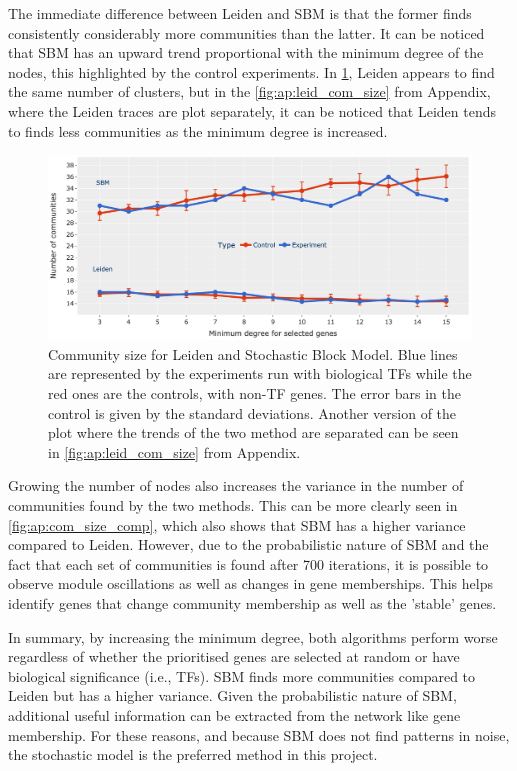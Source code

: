 The immediate difference between Leiden and SBM is that the former finds consistently considerably more communities than the latter. It can be noticed that SBM has an upward trend proportional with the minimum degree of the nodes, this highlighted by the control experiments. In \cref{fig:N_I:comp_size_com_det}, Leiden appears to find the same number of clusters, but in the \cref{fig:ap:leid_com_size} from Appendix, where the Leiden traces are plot separately, it can be noticed that Leiden tends to finds less communities as the minimum degree is increased. 

\begin{figure}[!t]   
\centering
\includegraphics[width=1.0\textwidth,height=1.0\textheight,keepaspectratio]{Sections/Network_I/Resources/selective_pruning/com_comp/sbm_Leiden_combNum.png}
  \caption{Community size for Leiden and Stochastic Block Model. Blue lines are represented by the experiments run with biological TFs while the red ones are the controls, with non-TF genes. The error bars in the control is given by the standard deviations. Another version of the plot where the trends of the two method are separated can be seen in \cref{fig:ap:leid_com_size} from Appendix.}
\label{fig:N_I:comp_size_com_det}
\end{figure}

Growing the number of nodes also increases the variance in the number of communities found by the two methods. This can be more clearly seen in \cref{fig:ap:com_size_comp}, which also shows that SBM has a higher variance compared to Leiden. However, due to the probabilistic nature of SBM and the fact that each set of communities is found after 700 iterations, it is possible to observe module oscillations as well as changes in gene memberships. This helps identify genes that change community membership as well as the 'stable' genes.

In summary, by increasing the minimum degree, both algorithms perform worse regardless of whether the prioritised genes are selected at random or have biological significance (i.e., TFs). SBM finds more communities compared to Leiden but has a higher variance. Given the probabilistic nature of SBM, additional useful information can be extracted from the network like gene membership. For these reasons, and because SBM does not find patterns in noise, the stochastic model is the preferred method in this project.


